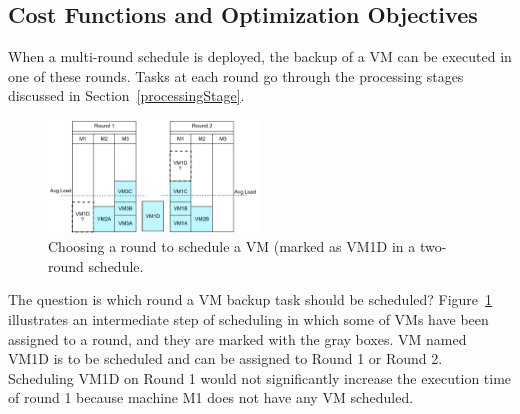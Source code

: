 \subsection{Cost Functions and Optimization Objectives}


When a multi-round schedule is deployed, the backup of a  VM can be executed in one of these rounds.
Tasks at each round go through the processing stages discussed in Section~\ref{processingStage}.
\begin{figure}[thb]
\centering
\includegraphics[width=0.5\textwidth]{images/VMRound.pdf}
\caption{Choosing a round to schedule a VM (marked as VM1D in a two-round schedule.  }
\label{fig:VMRound}
\end{figure}

The question is which round a VM backup task should be scheduled?
Figure~\ref{fig:VMRound} illustrates an intermediate step of scheduling in which
some of VMs have been assigned to a round, and they are marked with the gray boxes. 
VM named  VM1D is to be scheduled and  can be assigned  to Round 1 or Round 2.
Scheduling VM1D on Round 1 would not significantly increase the execution time of round 1
because machine M1 does not have any VM scheduled.

